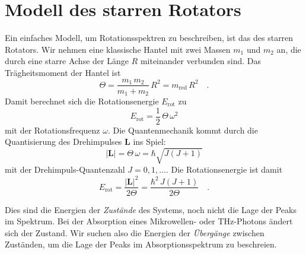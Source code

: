 \begin{marginfigure}
\caption{Das HCl-Spektrum aus Abbildung \ref{fig:rot_hcl} als Extinktionsspektrum.}
\end{marginfigure}




\section{Modell des starren Rotators}

Ein einfaches Modell, um Rotationsspektren zu beschreiben, ist das des starren Rotators. Wir nehmen eine klassische Hantel mit zwei Massen $m_1$ und $m_2$ an, die durch eine starre Achse der Länge $R$ miteinander verbunden sind. Das Trägheitsmoment der Hantel ist
\begin{equation}
 \Theta = \frac{m_1 \, m_2}{m_1 + m_2} \, R^2 = m_\text{red} \, R^2 \quad .
\end{equation}
Damit berechnet sich die Rotationsenergie $E_\text{rot}$ zu
\begin{equation}
 E_\text{rot} = \frac{1}{2} \, \Theta \, \omega^2
\end{equation}
mit der Rotationsfrequenz $\omega$. Die Quantenmechanik kommt durch die Quantisierung des Drehimpulses $\mathbf{L} $ ins Spiel:
\begin{equation}
 | \mathbf{L} | = \Theta \, \omega = \hbar \sqrt{J (J + 1)}
\end{equation}
mit der Drehimpuls-Quantenzahl $J = 0, 1, \dots$. Die Rotationsenergie ist damit
\begin{equation}
 E_\text{rot} = \frac{ | \mathbf{L} |^2}{2 \Theta} = \frac{\hbar^2 \, J (J+1)}{2 \Theta} \quad .
\end{equation}

Dies sind die Energien der \emph{Zustände} des Systems, noch nicht die Lage der Peaks im Spektrum. Bei der Absorption eines Mikrowellen- oder THz-Photons ändert sich der Zustand. Wir suchen also die Energien der \emph{Übergänge} zwischen Zuständen, um die Lage der Peaks im Absorptionsspektrum zu beschreien.





